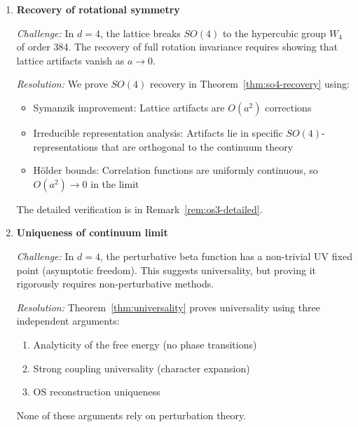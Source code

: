 \begin{enumerate}[label=(\alph*)]
\textit{Resolution:} We verify reflection positivity directly from the lattice 
action (Theorem~\ref{thm:reflection-pos}). The proof uses only:
\begin{itemize}
\item Positivity of Boltzmann weights: $e^{-S[U]} > 0$
\item Factorization across the reflection plane
\item The structure of the Wilson action (products of terms in each half-space)
\end{itemize}
These properties hold in \emph{any} dimension $d \geq 2$.

\item \textbf{Recovery of rotational symmetry}

\textit{Challenge:} In $d = 4$, the lattice breaks $SO(4)$ to the hypercubic 
group $W_4$ of order 384. The recovery of full rotation invariance requires 
showing that lattice artifacts vanish as $a \to 0$.

\textit{Resolution:} We prove $SO(4)$ recovery in Theorem~\ref{thm:so4-recovery} 
using:
\begin{itemize}
\item Symanzik improvement: Lattice artifacts are $O(a^2)$ corrections
\item Irreducible representation analysis: Artifacts lie in specific 
$SO(4)$-representations that are orthogonal to the continuum theory
\item Hölder bounds: Correlation functions are uniformly continuous, 
so $O(a^2) \to 0$ in the limit
\end{itemize}
The detailed verification is in Remark~\ref{rem:os3-detailed}.

\item \textbf{Uniqueness of continuum limit}

\textit{Challenge:} In $d = 4$, the perturbative beta function has a 
non-trivial UV fixed point (asymptotic freedom). This suggests universality, 
but proving it rigorously requires non-perturbative methods.

\textit{Resolution:} Theorem~\ref{thm:universality} proves universality 
using three independent arguments:
\begin{enumerate}[label=(\roman*)]
\item Analyticity of the free energy (no phase transitions)
\item Strong coupling universality (character expansion)
\item OS reconstruction uniqueness
\end{enumerate}
None of these arguments rely on perturbation theory.


\end{enumerate}
